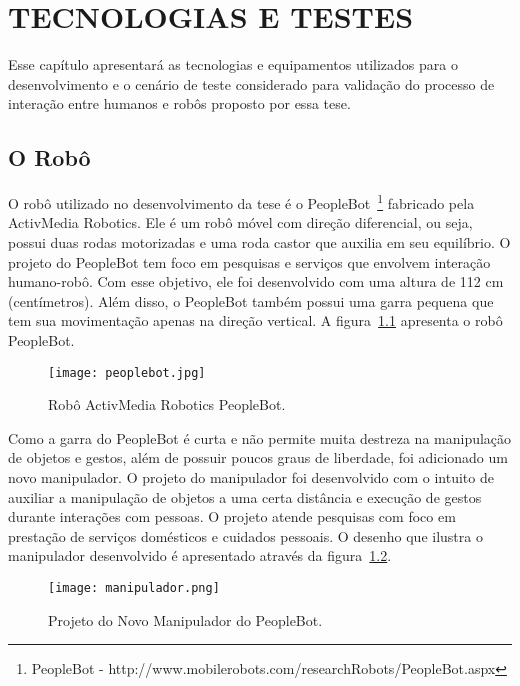 \chapter{TECNOLOGIAS E TESTES}
\label{cap:tecnologiaetestes}
Esse capítulo apresentará as tecnologias e equipamentos utilizados para o desenvolvimento e o cenário de teste considerado para validação do processo de interação entre humanos e robôs proposto por essa tese.

\section{O Robô}
\label{sec:robo}
O robô utilizado no desenvolvimento da tese é o PeopleBot~\footnote{PeopleBot - http://www.mobilerobots.com/researchRobots/PeopleBot.aspx} fabricado pela ActivMedia Robotics. Ele é um robô móvel com direção diferencial, ou seja, possui duas rodas motorizadas e uma roda castor que auxilia em seu equilíbrio. O projeto do PeopleBot tem foco em pesquisas e serviços que envolvem interação humano-robô. Com esse objetivo, ele foi desenvolvido com uma altura de 112 cm (centímetros). Além disso, o PeopleBot também possui uma garra pequena que tem sua movimentação apenas na direção vertical. A figura~\ref{fig:peoplebot} apresenta o robô PeopleBot.

\begin{figure}[ht!]
	\centering
	\begin{minipage}{\textwidth}
		\caption{Robô ActivMedia Robotics PeopleBot.}
		\texttt{[image: peoplebot.jpg]}
		\label{fig:peoplebot}
	\end{minipage}
\end{figure}

Como a garra do PeopleBot é curta e não permite muita destreza na manipulação de objetos e gestos, além de possuir poucos graus de liberdade, foi adicionado um novo manipulador. O projeto do manipulador foi desenvolvido com o intuito de auxiliar a manipulação de objetos a uma certa distância e execução de gestos durante interações com pessoas. O projeto atende pesquisas com foco em prestação de serviços domésticos e cuidados pessoais. O desenho que ilustra o manipulador desenvolvido é apresentado através da figura~\ref{fig:manipulador}.

\begin{figure}[ht!]
	\centering
	\begin{minipage}{0.6\textwidth}
		\caption{Projeto do Novo Manipulador do PeopleBot.}
		\texttt{[image: manipulador.png]}
		\label{fig:manipulador}
	\end{minipage}
\end{figure}

